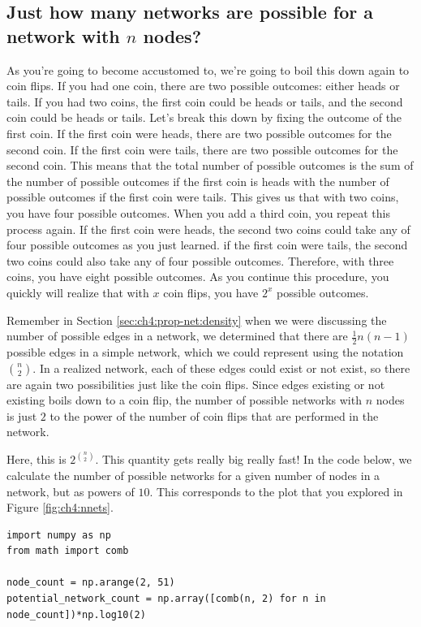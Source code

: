 \subsection{Just how many networks are possible for a network with $n$ nodes?}
 
As you're going to become accustomed to, we're going to boil this down again to coin flips. If you had one coin, there are two possible outcomes: either heads or tails. If you had two coins, the first coin could be heads or tails, and the second coin could be heads or tails. Let's break this down by fixing the outcome of the first coin. If the first coin were heads, there are two possible outcomes for the second coin. If the first coin were tails, there are two possible outcomes for the second coin. This means that the total number of possible outcomes is the sum of the number of possible outcomes if the first coin is heads with the number of possible outcomes if the first coin were tails. This gives us that with two coins, you have four possible outcomes. When you add a third coin, you repeat this process again. If the first coin were heads, the second two coins could take any of four possible outcomes as you just learned. if the first coin were tails, the second two coins could also take any of four possible outcomes. Therefore, with three coins, you have eight possible outcomes. As you continue this procedure, you quickly will realize that with $x$ coin flips, you have $2^x$ possible outcomes. 

Remember in Section \ref{sec:ch4:prop-net:density} when we were discussing the number of possible edges in a network, we determined that there are $\frac{1}{2}n(n - 1)$ possible edges in a simple network, which we could represent using the notation $\binom n 2$. In a realized network, each of these edges could exist or not exist, so there are again two possibilities just like the coin flips. Since edges existing or not existing boils down to a coin flip, the number of possible networks with $n$ nodes is just $2$ to the power of the number of coin flips that are performed in the network. 

Here, this is $2^{\binom n 2}$. This quantity gets {really} big {really} fast! In the code below, we calculate the number of possible networks for a given number of nodes in a network, but as powers of $10$. This corresponds to the plot that you explored in Figure \ref{fig:ch4:nnets}.


\begin{lstlisting}[style=python]
import numpy as np
from math import comb

node_count = np.arange(2, 51)
potential_network_count = np.array([comb(n, 2) for n in node_count])*np.log10(2)
\end{lstlisting}

